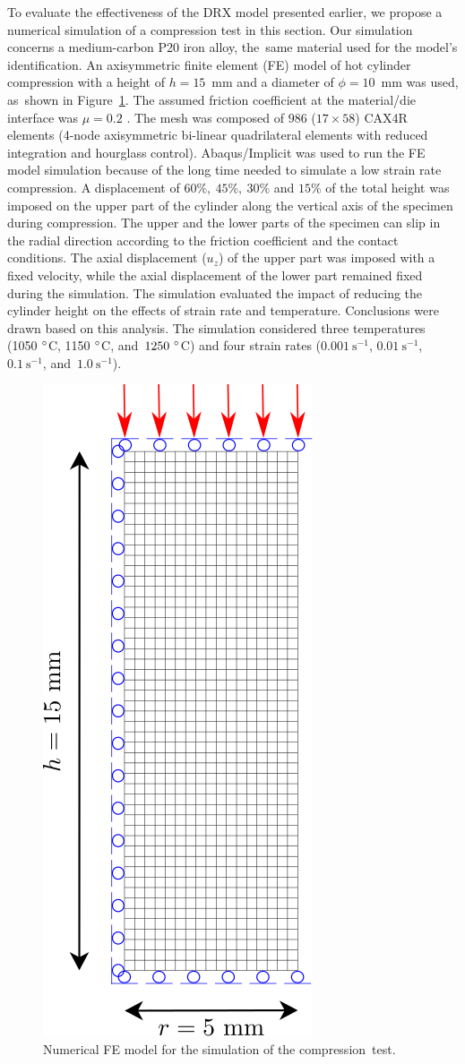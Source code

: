 \documentclass[metals,article,accept,pdftex,moreauthors]{Definitions/mdpi}
\DeclareRobustCommand{\ps}{\text{s}^{-1}}
\begin{document}
To evaluate the effectiveness of the DRX model presented earlier, we propose a numerical simulation of a compression test in this section.
Our simulation concerns a medium-carbon P20 iron alloy, the~same material used for the model's identification.
\linebreak An axisymmetric finite element (FE) model of hot cylinder compression with a height of $h=15$~mm and a diameter of $\phi=10$~mm was used, as~shown in Figure~\ref{fig:Mesh}.
The assumed friction coefficient at the material/die interface was $\mu=0.2$ \cite{Zhang-2019,Sun-2020}.
The mesh was composed of $986$ ($17\times58$) CAX4R elements (4-node axisymmetric bi-linear quadrilateral elements with reduced integration and hourglass control).
Abaqus/Implicit was used to run the FE model simulation because of the long time needed to simulate a low strain rate compression.
\linebreak A displacement of $60\%, ~45\%, ~30\%$ and $15\%$ of the total height was imposed on the upper part of the cylinder along the vertical axis of the specimen during compression.
The upper and the lower parts of the specimen can slip in the radial direction according to the friction coefficient and the contact conditions.
The axial displacement ($u_z$) of the upper part was imposed with a fixed velocity, while the axial displacement of the lower part remained fixed during the simulation.
The simulation evaluated the impact of reducing the cylinder height on the effects of strain rate and temperature.
Conclusions were drawn based on this analysis.
The simulation considered three temperatures (1050 $\degree$C, 1150 $\degree$C, and~$1250~\degree$C) and four strain rates ($0.001~\ps$, $0.01~\ps$, $0.1~\ps$, and~$1.0~\ps$).
\begin{figure}[H]
\centering
\includegraphics[height=0.7\columnwidth]{Figures/CyCompression2}
\caption{Numerical FE model for the simulation of the compression~test.}
\label{fig:Mesh}
\end{figure}
\unskip
\end{document}

